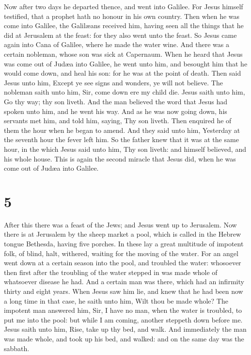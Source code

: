  Now after two days he departed thence, and went into
Galilee.  For Jesus himself testified, that a prophet
hath no honour in his own country.  Then when he was come
into Galilee, the Galilæans received him, having seen all the things
that he did at Jerusalem at the feast: for they also went unto the
feast.  So Jesus came again into Cana of Galilee, where
he made the water wine. And there was a certain nobleman, whose son was
sick at Capernaum.  When he heard that Jesus was come out
of Judæa into Galilee, he went unto him, and besought him that he would
come down, and heal his son: for he was at the point of death.
 Then said Jesus unto him, Except ye see signs and
wonders, ye will not believe.  The nobleman saith unto
him, Sir, come down ere my child die.  Jesus saith unto
him, Go thy way; thy son liveth. And the man believed the word that
Jesus had spoken unto him, and he went his way.  And as
he was now going down, his servants met him, and told him, saying, Thy
son liveth.  Then enquired he of them the hour when he
began to amend. And they said unto him, Yesterday at the seventh hour
the fever left him.  So the father knew that it was at
the same hour, in the which Jesus said unto him, Thy son liveth: and
himself believed, and his whole house.  This is again the
second miracle that Jesus did, when he was come out of Judæa into
Galilee.

\hypertarget{section-4}{%
\section{5}\label{section-4}}

 After this there was a feast of the Jews; and Jesus went
up to Jerusalem.  Now there is at Jerusalem by the sheep
market a pool, which is called in the Hebrew tongue Bethesda, having
five porches.  In these lay a great multitude of impotent
folk, of blind, halt, withered, waiting for the moving of the water.
 For an angel went down at a certain season into the pool,
and troubled the water: whosoever then first after the troubling of the
water stepped in was made whole of whatsoever disease he had.
 And a certain man was there, which had an infirmity
thirty and eight years.  When Jesus saw him lie, and knew
that he had been now a long time in that case, he saith unto him, Wilt
thou be made whole?  The impotent man answered him, Sir, I
have no man, when the water is troubled, to put me into the pool: but
while I am coming, another steppeth down before me.  Jesus
saith unto him, Rise, take up thy bed, and walk.  And
immediately the man was made whole, and took up his bed, and walked: and
on the same day was the sabbath.

